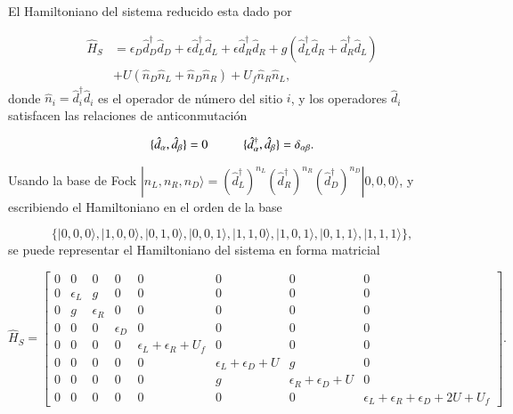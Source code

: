 El Hamiltoniano del sistema reducido esta dado por 

\begin{align*}
    \hat{H}_{S} & = \epsilon_{D}\hat{d}^{\dagger}_{D}\hat{d}_{D} + \epsilon \hat{d}^{\dagger}_{L}\hat{d}_{L} + \epsilon \hat{d}^{\dagger}_{R}\hat{d}_{R} + g(\hat{d}^{\dagger}_{L}\hat{d}_{R} + \hat{d}^{\dagger}_{R}\hat{d}_{L} ) \\
          & + U(\hat{n}_{D}\hat{n}_{L} + \hat{n}_{D}\hat{n}_{R} )  + U_{f}\hat{n}_{R}\hat{n}_{L},
\end{align*}
donde $\hat{n}_{i} = \hat{d}^{\dagger}_{i} \hat{d}_{i}$ es el operador de número del sitio $i$, y los operadores $\hat{d}_{i}$ satisfacen las relaciones de anticonmutación

\begin{equation*}
    \{\hat{d}_{\alpha},\hat{d}_{\beta} \} = 0  \hspace{10mm} \{\hat{d}^{\dagger}_{\alpha}, \hat{d}_{\beta} \} = \delta_{\alpha \beta}.
\end{equation*}

Usando la base de Fock $|n_{L},n_{R},n_{D} \rangle = (\hat{d}^{\dagger}_{L})^{n_{L}}(\hat{d}^{\dagger}_{R})^{n_{R}}(\hat{d}^{\dagger}_{D})^{n_{D}}|0,0,0\rangle$, y escribiendo el Hamiltoniano en el orden de la base 

\begin{equation*}
     \{|0,0,0\rangle, |1,0,0\rangle, |0,1,0\rangle, |0,0,1\rangle, |1,1,0\rangle, |1,0,1\rangle, |0,1,1\rangle, |1,1,1\rangle\},
\end{equation*}
se puede representar el Hamiltoniano del sistema en forma matricial 

\begin{equation*}
    \hat{H}_{S} = 
    \begin{bmatrix}
        0 & 0 & 0 & 0 & 0 & 0 & 0 & 0 \\
        0 & \epsilon_{L} & g & 0 & 0 & 0 & 0 & 0 \\
        0 & g & \epsilon_{R} & 0 & 0 & 0 & 0 & 0 \\
        0 & 0 & 0 & \epsilon_{D} & 0 & 0 & 0 & 0 \\
        0 & 0 & 0 & 0 & \epsilon_{L} + \epsilon_{R}  + U_{f} & 0 & 0 & 0 \\
        0 & 0 & 0 & 0 & 0 & \epsilon_{L} + \epsilon_{D} + U & g & 0 \\
        0 & 0 & 0 & 0 & 0 & g & \epsilon_{R} + \epsilon_{D} + U & 0 \\
        0 & 0 & 0 & 0 & 0 & 0 & 0 & \epsilon_{L} + \epsilon_{R}  + \epsilon_{D} + 2U + U_{f} 
        \end{bmatrix}.
\end{equation*}

